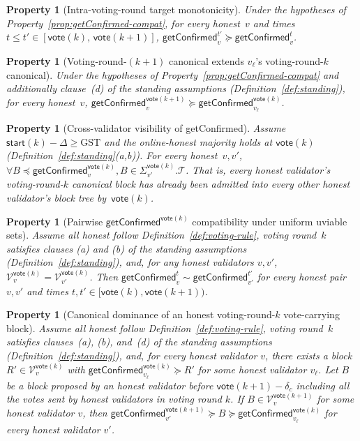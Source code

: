 \ifx\litemode\undefined\documentclass{article}\fi
\newcommand{\T}[0]{\ensuremath{\mathcal{T}}}
\newcommand{\V}[0]{\ensuremath{\mathcal{V}}}
\newcommand{\start}{\ensuremath{\mathsf{start}}}
\newcommand{\vote}{\ensuremath{\mathsf{vote}}}
\newcommand{\GST}{\ensuremath{\mathrm{GST}}\xspace}
\newcommand{\getConfirmed}{\textsf{getConfirmed}\xspace}
\theoremstyle{plain}
\newtheorem{property}[theorem]{Property}
\theoremstyle{definition}
\theoremstyle{remark}
\begin{document}
\begin{property}[Intra-voting-round target monotonicity]\label{prop:getConfirmed-monotone}
Under the hypotheses of Property~\ref{prop:getConfirmed-compat}, for every honest~$v$ and times $t \leq t' \in [\vote(k),\, \vote(k{+}1)]$, $\getConfirmed_v^{t'} \succeq \getConfirmed_v^t$.
\end{property}

\begin{property}[Voting-round-$(k{+}1)$ canonical extends $v_\ell$'s voting-round-$k$ canonical]\label{prop:target-dominance}
Under the hypotheses of Property~\ref{prop:getConfirmed-compat} and additionally clause~(d) of the standing assumptions (Definition~\ref{def:standing}), for every honest~$v$, $\getConfirmed_v^{\vote(k+1)} \succeq \getConfirmed_{v_\ell}^{\vote(k)}$.
\end{property}

\begin{property}[Cross-validator visibility of \getConfirmed]\label{prop:getConfirmed-visible}
Assume $\start(k) - \Delta \geq \GST$ and the online-honest majority holds at $\vote(k)$ (Definition~\ref{def:standing}(a,b)).
For every honest~$v,v'$, $\forall B \preceq \getConfirmed_v^{\vote(k)}, B\in \Sigma_{v'}^{\vote(k)}.\T$.
That is, every honest validator's voting-round-$k$ canonical block has already been admitted into every other honest validator's block tree by~$\vote(k)$.
\end{property}

\begin{property}[Pairwise $\getConfirmed^{\vote(k)}$ compatibility under uniform uviable sets]\label{prop:getConfirmed-pairwise-from-V}
Assume all honest follow Definition~\ref{def:voting-rule}, voting round~$k$ satisfies clauses (a) and (b) of the standing assumptions (Definition~\ref{def:standing}), and, for any honest validators $v,v'$, $\V_v^{\vote(k)}=\V_{v'}^{\vote(k)}$.
Then $\getConfirmed_v^{t} \sim \getConfirmed_{v'}^{t'}$ for every honest pair $v, v'$ and times $t,t' \in [\vote(k),\vote(k+1))$.
\end{property}

\begin{property}[Canonical dominance of an honest voting-round-$k$ vote-carrying block]\label{prop:vote-carrier-dominance}
Assume all honest follow Definition~\ref{def:voting-rule}, voting round~$k$ satisfies clauses~(a), (b), and~(d) of the standing assumptions (Definition~\ref{def:standing}), and, for every honest validator $v$, there exists a block $R' \in \V_v^{\vote(k)}$ with $\getConfirmed_{v_\ell}^{\vote(k)} \succeq R'$ for some honest validator $v_\ell$.
Let $B$ be a block proposed by an honest validator before $\vote(k+1) - \delta_c$ including all the votes sent by honest validators in voting round $k$.
If $B \in \V_v^{\vote(k+1)}$ for some honest validator $v$, then $\getConfirmed_{v'}^{\vote(k+1)} \succeq B\succeq \getConfirmed_{v_\ell}^{\vote(k)}$ for every honest validator $v'$.
\end{property}
\end{document}
